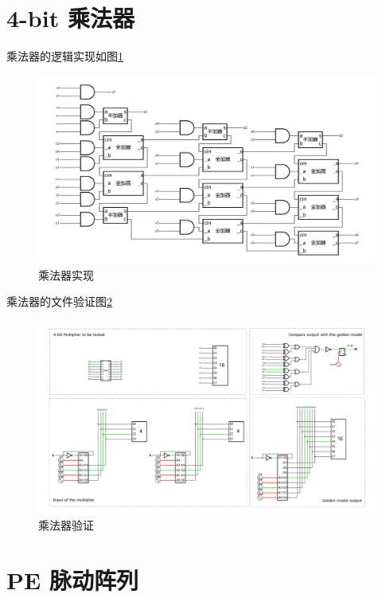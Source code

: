 \documentclass{article}
\newcommand{\np}{\noindent\par}
\begin{document}
\section{4-bit 乘法器}

乘法器的逻辑实现如图\ref{fig:chengfaqishixian} \np

\begin{figure}[htbp]
    \centering
    \includegraphics[width=1\textwidth]{4-bit乘法器.pdf}
    \caption{乘法器实现}
    \label{fig:chengfaqishixian}
\end{figure}

乘法器的文件验证图\ref{fig:chengfaqiyanzheng}

\begin{figure}[htbp]
    \centering
    \includegraphics[width=1\textwidth]{乘法器验证.pdf}
    \caption{乘法器验证}
    \label{fig:chengfaqiyanzheng}
\end{figure}

\section{PE 脉动阵列}
\end{document}
